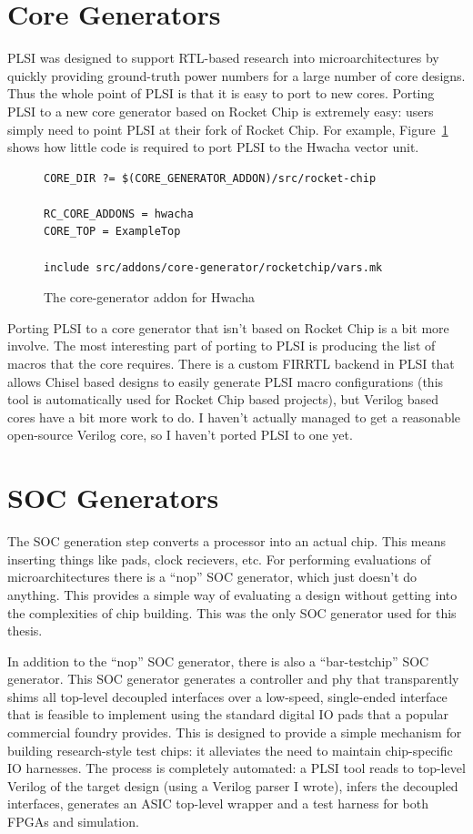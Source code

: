 \documentclass{article}
\begin{document}
\section{Core Generators}

PLSI was designed to support RTL-based research into microarchitectures by
quickly providing ground-truth power numbers for a large number of core
designs.  Thus the whole point of PLSI is that it is easy to port to new cores.
Porting PLSI to a new core generator based on Rocket Chip is extremely easy:
users simply need to point PLSI at their fork of Rocket Chip.  For example,
Figure~\ref{impl:hwacha-coregen} shows how little code is required to port PLSI
to the Hwacha vector unit.

\begin{figure}
\begin{verbatim}
CORE_DIR ?= $(CORE_GENERATOR_ADDON)/src/rocket-chip

RC_CORE_ADDONS = hwacha
CORE_TOP = ExampleTop

include src/addons/core-generator/rocketchip/vars.mk
\end{verbatim}
\caption{The core-generator addon for Hwacha}
\label{impl:hwacha-coregen}
\end{figure}

Porting PLSI to a core generator that isn't based on Rocket Chip is a bit more
involve.  The most interesting part of porting to PLSI is producing the list of
macros that the core requires.  There is a custom FIRRTL backend in PLSI that
allows Chisel based designs to easily generate PLSI macro configurations (this
tool is automatically used for Rocket Chip based projects), but Verilog based
cores have a bit more work to do.  I haven't actually managed to get a
reasonable open-source Verilog core, so I haven't ported PLSI to one yet.

\section{SOC Generators}

The SOC generation step converts a processor into an actual chip.  This means
inserting things like pads, clock recievers, etc.  For performing evaluations
of microarchitectures there is a ``nop'' SOC generator, which just doesn't do
anything.  This provides a simple way of evaluating a design without getting
into the complexities of chip building.  This was the only SOC generator used
for this thesis.

In addition to the ``nop'' SOC generator, there is also a ``bar-testchip'' SOC
generator.  This SOC generator generates a controller and phy that
transparently shims all top-level decoupled interfaces over a low-speed,
single-ended interface that is feasible to implement using the standard digital
IO pads that a popular commercial foundry provides.  This is designed to
provide a simple mechanism for building research-style test chips: it
alleviates the need to maintain chip-specific IO harnesses.  The process is
completely automated: a PLSI tool reads to top-level Verilog of the target
design (using a Verilog parser I wrote), infers the decoupled interfaces,
generates an ASIC top-level wrapper and a test harness for both FPGAs and
simulation.
\end{document}
